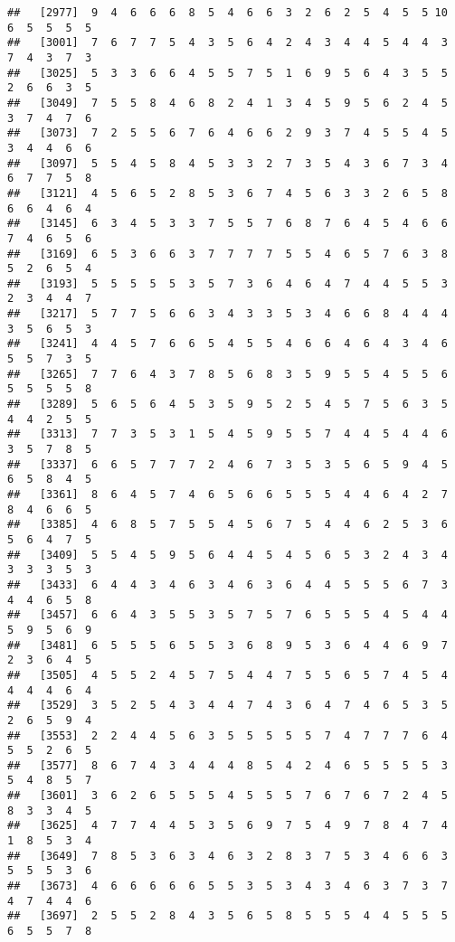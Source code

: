 \documentclass[
]{book}
\begin{document}
\begin{verbatim}
##   [2977]  9  4  6  6  6  8  5  4  6  6  3  2  6  2  5  4  5  5 10  6  5  5  5  5
##   [3001]  7  6  7  7  5  4  3  5  6  4  2  4  3  4  4  5  4  4  3  7  4  3  7  3
##   [3025]  5  3  3  6  6  4  5  5  7  5  1  6  9  5  6  4  3  5  5  2  6  6  3  5
##   [3049]  7  5  5  8  4  6  8  2  4  1  3  4  5  9  5  6  2  4  5  3  7  4  7  6
##   [3073]  7  2  5  5  6  7  6  4  6  6  2  9  3  7  4  5  5  4  5  3  4  4  6  6
##   [3097]  5  5  4  5  8  4  5  3  3  2  7  3  5  4  3  6  7  3  4  6  7  7  5  8
##   [3121]  4  5  6  5  2  8  5  3  6  7  4  5  6  3  3  2  6  5  8  6  6  4  6  4
##   [3145]  6  3  4  5  3  3  7  5  5  7  6  8  7  6  4  5  4  6  6  7  4  6  5  6
##   [3169]  6  5  3  6  6  3  7  7  7  7  5  5  4  6  5  7  6  3  8  5  2  6  5  4
##   [3193]  5  5  5  5  5  3  5  7  3  6  4  6  4  7  4  4  5  5  3  2  3  4  4  7
##   [3217]  5  7  7  5  6  6  3  4  3  3  5  3  4  6  6  8  4  4  4  3  5  6  5  3
##   [3241]  4  4  5  7  6  6  5  4  5  5  4  6  6  4  6  4  3  4  6  5  5  7  3  5
##   [3265]  7  7  6  4  3  7  8  5  6  8  3  5  9  5  5  4  5  5  6  5  5  5  5  8
##   [3289]  5  6  5  6  4  5  3  5  9  5  2  5  4  5  7  5  6  3  5  4  4  2  5  5
##   [3313]  7  7  3  5  3  1  5  4  5  9  5  5  7  4  4  5  4  4  6  3  5  7  8  5
##   [3337]  6  6  5  7  7  7  2  4  6  7  3  5  3  5  6  5  9  4  5  6  5  8  4  5
##   [3361]  8  6  4  5  7  4  6  5  6  6  5  5  5  4  4  6  4  2  7  8  4  6  6  5
##   [3385]  4  6  8  5  7  5  5  4  5  6  7  5  4  4  6  2  5  3  6  5  6  4  7  5
##   [3409]  5  5  4  5  9  5  6  4  4  5  4  5  6  5  3  2  4  3  4  3  3  3  5  3
##   [3433]  6  4  4  3  4  6  3  4  6  3  6  4  4  5  5  5  6  7  3  4  4  6  5  8
##   [3457]  6  6  4  3  5  5  3  5  7  5  7  6  5  5  5  4  5  4  4  5  9  5  6  9
##   [3481]  6  5  5  5  6  5  5  3  6  8  9  5  3  6  4  4  6  9  7  2  3  6  4  5
##   [3505]  4  5  5  2  4  5  7  5  4  4  7  5  5  6  5  7  4  5  4  4  4  4  6  4
##   [3529]  3  5  2  5  4  3  4  4  7  4  3  6  4  7  4  6  5  3  5  2  6  5  9  4
##   [3553]  2  2  4  4  5  6  3  5  5  5  5  5  7  4  7  7  7  6  4  5  5  2  6  5
##   [3577]  8  6  7  4  3  4  4  4  8  5  4  2  4  6  5  5  5  5  3  5  4  8  5  7
##   [3601]  3  6  2  6  5  5  5  4  5  5  5  7  6  7  6  7  2  4  5  8  3  3  4  5
##   [3625]  4  7  7  4  4  5  3  5  6  9  7  5  4  9  7  8  4  7  4  1  8  5  3  4
##   [3649]  7  8  5  3  6  3  4  6  3  2  8  3  7  5  3  4  6  6  3  5  5  5  3  6
##   [3673]  4  6  6  6  6  6  5  5  3  5  3  4  3  4  6  3  7  3  7  4  7  4  4  6
##   [3697]  2  5  5  2  8  4  3  5  6  5  8  5  5  5  4  4  5  5  5  6  5  5  7  8

\end{verbatim}
\end{document}
